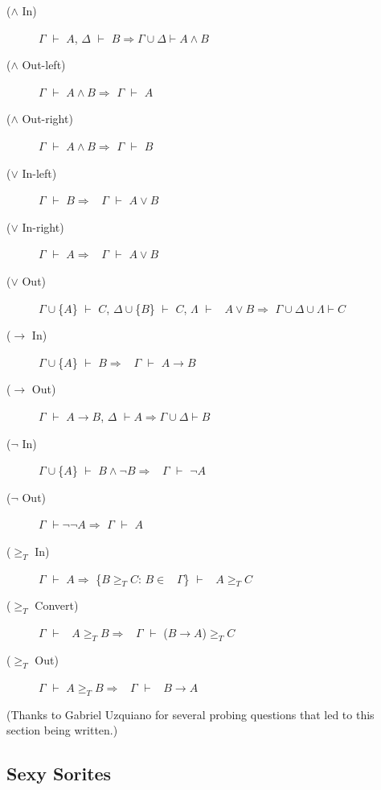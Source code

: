 \begin{description}
\item[(\(\wedge\) In)]
\(\Gamma\) \(\vdash\) \(A\), \(\Delta\) \(\vdash\)
\(B \Rightarrow \Gamma \cup\Delta \vdash A \wedge B\)
\item[(\(\wedge\) Out-left)]
\(\Gamma\) \(\vdash\) \(A \wedge B \Rightarrow\) \(\Gamma\) \(\vdash\)
\(A\)
\item[(\(\wedge\) Out-right)]
\(\Gamma\) \(\vdash\) \(A \wedge B \Rightarrow\) \(\Gamma\) \(\vdash\)
\(B\)
\item[(\(\vee\) In-left)]
\(\Gamma\) \(\vdash\) \(B \Rightarrow\)~ \(\Gamma\) \(\vdash\)
\(A \vee B\)
\item[(\(\vee\) In-right)]
\(\Gamma\) \(\vdash\) \(A \Rightarrow\)~ \(\Gamma\) \(\vdash\)
\(A \vee B\)
\item[(\(\vee\) Out)]
\(\Gamma \cup\)\{\(A\)\} \(\vdash\) \(C\), \(\Delta \cup\)\{\(B\)\}
\(\vdash\) \(C\), \(\Lambda\) \(\vdash\) ~\(A \vee B \Rightarrow\)
\(\Gamma \cup \Delta \cup \Lambda \vdash C\)
\item[(\(\rightarrow\) In)]
\(\Gamma \cup\)\{\(A\)\} \(\vdash\) \(B \Rightarrow\)~ \(\Gamma\)
\(\vdash\) \(A \rightarrow B\)
\item[(\(\rightarrow\) Out)]
\(\Gamma\) \(\vdash\) \(A \rightarrow B\), \(\Delta\)
\(\vdash A \Rightarrow \Gamma \cup \Delta \vdash B\)
\item[(\(\neg\) In)]
\(\Gamma \cup\)\{\(A\)\} \(\vdash\) \(B \wedge \neg B \Rightarrow\)~
\(\Gamma\) \(\vdash\) \(\neg A\)
\item[(\(\neg\) Out)]
\(\Gamma\) \(\vdash \neg \neg A \Rightarrow\) \(\Gamma\) \(\vdash\)
\(A\)
\item[(\(\geqslant _T\) In)]
\(\Gamma\) \(\vdash\) \(A \Rightarrow\) \{\(B \geqslant _T C\):
\(B \in\)~ \(\Gamma\)\} \(\vdash\) ~\(A \geqslant _T C\)
\item[(\(\geqslant _T\) Convert)]
\(\Gamma\) \(\vdash\) ~\(A \geqslant _T B \Rightarrow\)~ \(\Gamma\)
\(\vdash\) (\(B \rightarrow A\))\(\geqslant _T C\)
\item[(\(\geqslant _T\) Out)]
\(\Gamma\) \(\vdash\) \(A \geqslant _T B \Rightarrow\)~ \(\Gamma\)
\(\vdash\) ~\(B \rightarrow A\)
\end{description}

(Thanks to Gabriel Uzquiano for several probing questions that led to
this section being written.)

\hypertarget{sexy-sorites}{%
\subsection{\texorpdfstring{Sexy Sorites
}{Sexy Sorites }}\label{sexy-sorites}}

